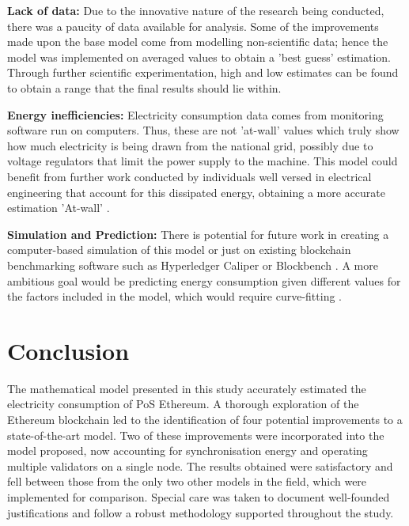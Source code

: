 \textbf{Lack of data:} Due to the innovative nature of the research being conducted, there was a paucity of data available for analysis. Some of the improvements made upon the base model come from modelling non-scientific data; hence the model was implemented on averaged values to obtain a 'best guess' estimation. Through further scientific experimentation, high and low estimates can be found to obtain a range that the final results should lie within. 

\textbf{Energy inefficiencies: } Electricity consumption data comes from monitoring software run on computers. Thus, these are not 'at-wall' values which truly show how much electricity is being drawn from the national grid, possibly due to voltage regulators that limit the power supply to the machine. This model could benefit from further work conducted by individuals well versed in electrical engineering that account for this dissipated energy, obtaining a more accurate estimation 'At-wall' \cite{Warkozek2012ACenters}.

\textbf{Simulation and Prediction: } There is potential for future work in creating a computer-based simulation of this model or just on existing blockchain benchmarking software such as Hyperledger Caliper or Blockbench \cite{Aldweesh2020BenchmarkingApplications}. A more ambitious goal would be predicting energy consumption given different values for the factors included in the model, which would require curve-fitting \cite{IbanezTheExpansion}.


\section{Conclusion}

The mathematical model presented in this study accurately estimated the electricity consumption of PoS Ethereum. A thorough exploration of the Ethereum blockchain led to the identification of four potential improvements to a state-of-the-art model. Two of these improvements were incorporated into the model proposed, now accounting for synchronisation energy and operating multiple validators on a single node. The results obtained were satisfactory and fell between those from the only two other models in the field, which were implemented for comparison. Special care was taken to document well-founded justifications and follow a robust methodology supported throughout the study. 

